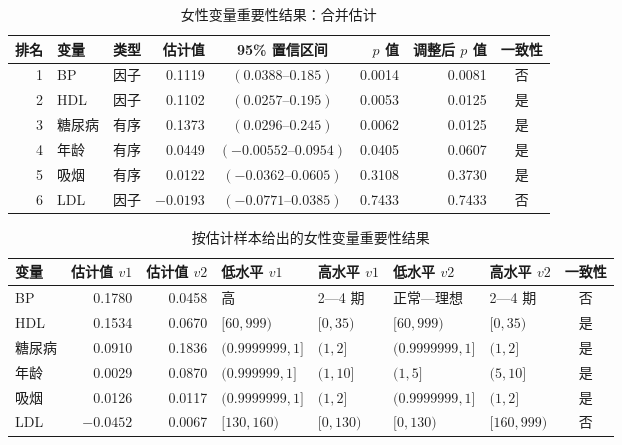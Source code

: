 \begin{table}[htbp]
\centering
\caption{女性变量重要性结果：合并估计}
\label{tab:ch09-female-combined}
\begingroup
\footnotesize
\setlength{\tabcolsep}{3pt}
\begin{adjustbox}{max width=\textwidth}
\begin{tabular}{@{}rllrcrrc@{}}
\toprule
排名 & 变量 & 类型 & 估计值 & 95\% 置信区间 & $p$ 值 & 调整后 $p$ 值 & 一致性 \\
\midrule
1 & BP & 因子 & 0.1119 & $(0.0388\text{–}0.185)$ & 0.0014 & 0.0081 & 否 \\
2 & HDL & 因子 & 0.1102 & $(0.0257\text{–}0.195)$ & 0.0053 & 0.0125 & 是 \\
3 & 糖尿病 & 有序 & 0.1373 & $(0.0296\text{–}0.245)$ & 0.0062 & 0.0125 & 是 \\
4 & 年龄 & 有序 & 0.0449 & $(-0.00552\text{–}0.0954)$ & 0.0405 & 0.0607 & 是 \\
5 & 吸烟 & 有序 & 0.0122 & $(-0.0362\text{–}0.0605)$ & 0.3108 & 0.3730 & 是 \\
6 & LDL & 因子 & $-0.0193$ & $(-0.0771\text{–}0.0385)$ & 0.7433 & 0.7433 & 否 \\
\bottomrule
\end{tabular}
\end{adjustbox}
\endgroup
\end{table}

\begin{table}[htbp]
\centering
\caption{按估计样本给出的女性变量重要性结果}
\label{tab:ch09-female-folds}
\begingroup
\footnotesize
\setlength{\tabcolsep}{2pt}
\begin{adjustbox}{max width=\textwidth}
\begin{tabular}{@{}lrrllllc@{}}
\toprule
变量 & 估计值 $v1$ & 估计值 $v2$ & 低水平 $v1$ & 高水平 $v1$ & 低水平 $v2$ & 高水平 $v2$ & 一致性 \\
\midrule
BP & 0.1780 & 0.0458 & 高 & 2—4 期 & 正常—理想 & 2—4 期 & 否 \\
HDL & 0.1534 & 0.0670 & $[60,999)$ & $[0,35)$ & $[60,999)$ & $[0,35)$ & 是 \\
糖尿病 & 0.0910 & 0.1836 & $(0.9999999,1]$ & $(1,2]$ & $(0.9999999,1]$ & $(1,2]$ & 是 \\
年龄 & 0.0029 & 0.0870 & $(0.999999,1]$ & $(1,10]$ & $(1,5]$ & $(5,10]$ & 是 \\
吸烟 & 0.0126 & 0.0117 & $(0.9999999,1]$ & $(1,2]$ & $(0.9999999,1]$ & $(1,2]$ & 是 \\
LDL & $-0.0452$ & 0.0067 & $[130,160)$ & $[0,130)$ & $[0,130)$ & $[160,999)$ & 否 \\
\bottomrule
\end{tabular}
\end{adjustbox}
\endgroup
\end{table}

